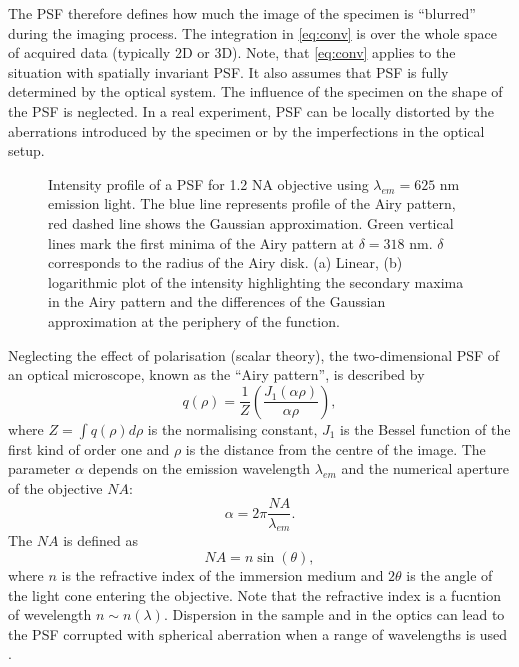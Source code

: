 The PSF therefore defines how much the image of the specimen is ``blurred'' during the imaging process. The integration in \autoref{eq:conv} is over the whole space of acquired data (typically 2D or 3D). Note, that \autoref{eq:conv} applies to the situation with spatially invariant PSF. It also assumes that PSF is fully determined by the optical system. The influence of the specimen on the shape of the PSF is neglected. In a real experiment, PSF can be locally distorted by the aberrations introduced by the specimen or by the imperfections in the optical setup.

\begin{figure}[!bht]
	\centering
	\newcommand{\wf}{.48\textwidth}
	\caption{Intensity profile of a PSF for 1.2 NA objective using $\lambda_{em}=625$ nm emission light. The blue line represents profile of the Airy pattern, red dashed line shows the Gaussian approximation. Green vertical lines mark the first minima of the Airy pattern at $\delta=318$ nm. $\delta$ corresponds to the radius of the Airy disk. (a) Linear, (b) logarithmic plot of the intensity highlighting the secondary maxima in the Airy pattern and the differences of the Gaussian approximation at the periphery of the function.}
	\label{fig:PSF}
\end{figure}
%
Neglecting the effect of polarisation (scalar theory), the two-dimensional PSF of an optical microscope, known as the ``Airy pattern'', is described by \cite{Born1999}
%
\begin{equation}
	q(\rho)=\frac{1}{Z}\left(\frac{J_1(\alpha \rho)}{\alpha \rho}\right),
\end{equation}
%
where $Z=\int q(\rho) d\rho$ is the normalising constant, $J_1$ is the Bessel function of the first kind of order one and $\rho$ is the distance from the centre of the image. The parameter $\alpha$ depends on the emission wavelength $\lambda_{em}$ and the numerical aperture of the objective $\unit{NA}$:
%
\begin{equation}
	\alpha=2\pi\frac{\unit{NA}}{\lambda_{em}}.
\end{equation}
% 
The $\unit{NA}$ is defined as
\begin{equation}
	\unit{NA}=n\sin(\theta),
	\label{eq:NA}
\end{equation}
%
where $n$ is the refractive index of the immersion medium and $2\theta$ is the angle of the light cone entering the objective. Note that the refractive index is a fucntion of wevelength $n\sim n(\lambda)$. Dispersion in the sample and in the optics can lead to the PSF corrupted with spherical aberration when a range of wavelengths is used \cite{SCALETTAR1996}.

